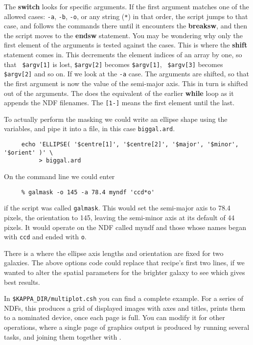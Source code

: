 The {\bf switch} looks for specific arguments.  If the first argument
matches one of the allowed cases: {\tt -a}, {\tt -b}, {\tt -o}, or any
string ({\tt{*}}) in that order, the script jumps to that case, and
follows the commands there until it encounters the {\bf breaksw}, and
then the script moves to the {\bf endsw} statement.  You may be
wondering why only the first element of the arguments is tested against
the cases.  This is where the {\bf shift} statement comes in.  This
decrements the element indices of an array by one, so that {\tt
\$argv[1]} is lost, {\tt \$argv[2]} becomes {\tt \$argv[1]}, {\tt
\$argv[3]} becomes {\tt \$argv[2]} and so on.  If we look at the
{\tt -a} case.  The arguments are shifted, so that the first argument
is now the value of the semi-major axis.  This in turn is shifted out
of the arguments.  The  does
the equivalent of the earlier {\bf while} loop  as it appends the NDF filenames.  The
{\tt [1-]} means the first element until the last.

To actually perform the masking we could write an  ellipse shape using the variables, and pipe it into a
file, in this case {\tt biggal.ard}.

\small
\begin{verbatim}
     echo 'ELLIPSE( '$centre[1]', '$centre[2]', '$major', '$minor', '$orient' )' \
          > biggal.ard
\end{verbatim}
\normalsize

On the command line we could enter

\small
\begin{verbatim}
     % galmask -o 145 -a 78.4 myndf 'ccd*o'
\end{verbatim}
\normalsize
if the script was called {\tt galmask}.  This would set the semi-major
axis to 78.4 pixels, the orientation to 145\dgs, leaving the
semi-minor axis at its default of 44 pixels.  It would operate on
the NDF called myndf and those whose names began with {\tt ccd} and
ended with {\tt o}.

There is a  \latexonly{in
Section~\ref{sc4_se_long1}} where the ellipse axis lengths and
orientation are fixed for two galaxies.  The above options code could
replace that recipe's first two lines, if we wanted to alter the
spatial parameters for the brighter galaxy to see which gives best
results.

In {\tt \$KAPPA\_DIR/multiplot.csh} you can find a complete example.
For a series of NDFs, this produces a grid of displayed images with
axes and titles, prints them to a nominated device, once each page is
full.  You can modify it for other operations, where a single page of
graphics output is produced by running several tasks, and joining them
together with \PSMERGEref\latexonly{ (SUN/164)}.

